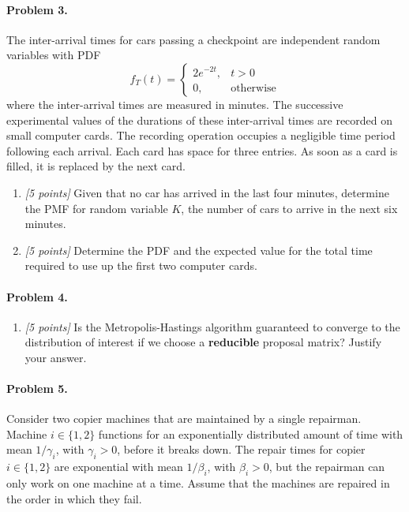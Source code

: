 \documentclass[article,12pt,a4paper]{article}
\begin{document}
	
	\paragraph{Problem 3.}
	The inter-arrival times for cars passing a checkpoint are independent random variables with PDF
	\[
	f_T(t) =
	\begin{cases}
		2e^{-2t}, & t > 0 \\
		0, & \text{otherwise}
	\end{cases}
	\]
	where the inter-arrival times are measured in minutes. The successive experimental values of the durations of these inter-arrival times are recorded on small computer cards. The recording operation occupies a negligible time period following each arrival. Each card has space for three entries. As soon as a card is filled, it is replaced by the next card.
	
	\begin{enumerate}
		\item\textit{[5 points]} Given that no car has arrived in the last four minutes, determine the PMF for random variable $K$, the number of cars to arrive in the next six minutes.
		
		\item\textit{[5 points]} Determine the PDF and the expected value for the total time required to use up the first two computer cards.
	\end{enumerate}
	
	
	\paragraph{Problem 4.}
	\begin{enumerate}
		\item\textit{[5 points]} Is the Metropolis-Hastings algorithm guaranteed to converge to the distribution of interest if we choose a \textbf{reducible} proposal matrix? Justify your answer.
	\end{enumerate}
	
	\paragraph{Problem 5.}
	Consider two copier machines that are maintained by a single repairman. Machine $i\in\{1,2\}$ functions for an exponentially distributed amount of time with mean $1/\gamma_i$, with $\gamma_i>0$, before it breaks down. 
	The repair times for copier $i\in\{1,2\}$ are exponential with mean $1/\beta_i$, with $\beta_i>0$, but the repairman can only work on one machine at a time. 
	Assume that the machines are repaired in the order in which they fail.
	
\end{document}
